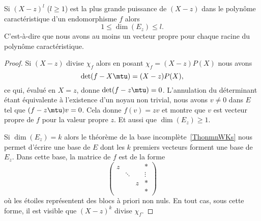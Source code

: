 \begin{proposition}\label{PropooBYZCooBmYLSc}
	Si \( (X-z)^l\) (\( l\geq 1\)) est la plus grande puissance de \( (X-z)\) dans le polynôme caractéristique d'un endomorphisme \( f\) alors
	\begin{equation}
		1\leq \dim(E_z)\leq l.
	\end{equation}
	C'est-à-dire que nous avons au moins un vecteur propre pour chaque racine du polynôme caractéristique.
\end{proposition}

\begin{proof}
	Si \( (X-z)\) divise \( \chi_f\) alors en posant \( \chi_f=(X-z)P(X)\) nous avons
	\begin{equation}
		\det(f-X\mtu)=(X-z)P(X),
	\end{equation}
	ce qui, évalué en \( X=z\), donne \( \det(f-z\mtu)=0\). L'annulation du déterminant étant équivalente à l'existence d'un noyau non trivial, nous avons \( v\neq 0\) dans \( E\) tel que \( (f-z\mtu)v=0\). Cela donne \( f(v)=zv\) et montre que \( v\) est vecteur propre de \( f\) pour la valeur propre \( z\). Et aussi que \( \dim(E_z)\geq 1\).

	Si \( \dim(E_z)=k\) alors le théorème de la base incomplète~\ref{ThonmnWKs} nous permet d'écrire une base de \( E\) dont les \( k\) premiers vecteurs forment une base de \( E_z\). Dans cette base, la matrice de \( f\) est de la forme
	\begin{equation}
		\begin{pmatrix}
			z &        &   & *      \\
			  & \ddots &   & \vdots \\
			  &        & z & *      \\
			  &        &   & *
		\end{pmatrix}
	\end{equation}
	où les étoiles représentent des blocs à priori non nuls. En tout cas, sous cette forme, il est visible que \( (X-z)^k\) divise \( \chi_f\).
\end{proof}
